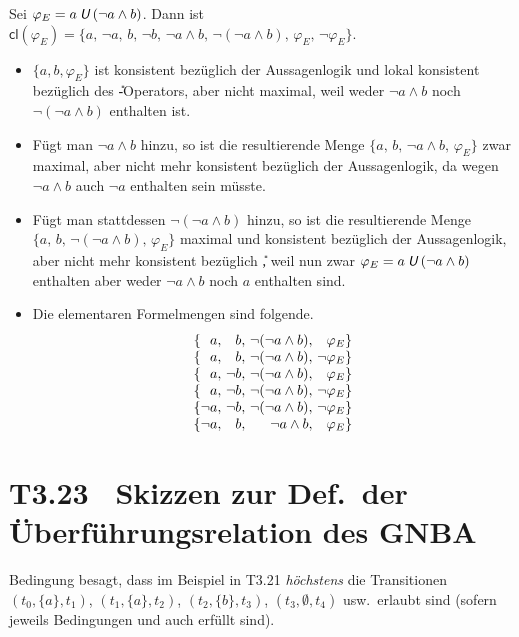\documentclass[fontsize=11pt, twoside=false, numbers=autoenddot]{scrbook}
\begin{document}
Sei $\varphi_E = a\mathbin{\textit{\textsf{U}}}(\lnot a \land b)$.
Dann ist $\textsf{cl}(\varphi_E) = \{a,\, \lnot a,\, b,\, \lnot b,\, \lnot a \land b,\, \lnot(\lnot a \land b),\, \varphi_E,\, \lnot \varphi_E\}$.
%
\begin{itemize}
  \item
    $\{a,b,\varphi_E\}$ ist konsistent bezüglich der Aussagenlogik und lokal konsistent bezüglich des \U-Operators,
    aber nicht maximal, weil weder $\lnot a \land b$ noch $\lnot(\lnot a \land b)$ enthalten ist.
  \item
    Fügt man $\lnot a \land b$ hinzu, so ist die resultierende Menge $\{a,\,b,\,\lnot a \land b,\,\varphi_E\}$ 
    zwar maximal, aber nicht mehr konsistent bezüglich der Aussagenlogik,
    da wegen $\lnot a \land b$ auch $\lnot a$ enthalten sein müsste.
  \item
    Fügt man stattdessen $\lnot(\lnot a \land b)$ hinzu, 
    so ist die resultierende Menge \mbox{$\{a,\,b,\,\lnot(\lnot a \land b),\,\varphi_E\}$}
    maximal und konsistent bezüglich der Aussagenlogik,
    aber nicht mehr konsistent bezüglich \U,
    weil nun zwar $\varphi_E = a \mathbin{\textit{\textsf{U}}} (\lnot a \land b)$ enthalten
    aber weder $\lnot a \land b$ noch $a$ enthalten sind.
  \item
    Die elementaren Formelmengen sind folgende.
    \[
      \begin{array}{@{\{}r@{,~}r@{,~}r@{,~}r@{\}}}
        a       & b       & \lnot(\lnot a \land b) & \varphi_E      \\
        a       & b       & \lnot(\lnot a \land b) & \lnot\varphi_E \\
        a       & \lnot b & \lnot(\lnot a \land b) & \varphi_E      \\
        a       & \lnot b & \lnot(\lnot a \land b) & \lnot\varphi_E \\
        \lnot a & \lnot b & \lnot(\lnot a \land b) & \lnot\varphi_E \\
        \lnot a & b       & \lnot a \land b        & \varphi_E
      \end{array}
    \]
\end{itemize}

\section*{T3.23~ Skizzen zur Def.\ der Überführungsrelation des GNBA}

Bedingung  besagt, dass im Beispiel in T3.21 \emph{höchstens}
die Transitionen $(t_0,\{a\},t_1)$, $(t_1,\{a\},t_2)$, $(t_2,\{b\},t_3)$, $(t_3,\emptyset,t_4)$ usw.\
erlaubt sind (sofern jeweils Bedingungen  und  auch erfüllt sind).
\end{document}
